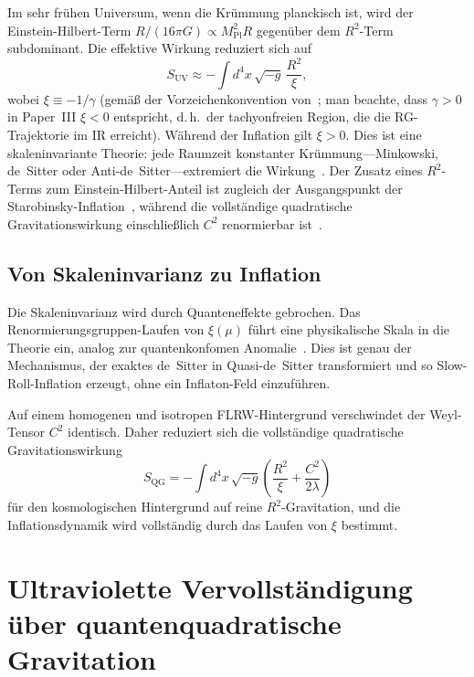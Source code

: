 \documentclass[aps,prd,twocolumn,superscriptaddress,nofootinbib]{revtex4-2}
\begin{document}
Im sehr frühen Universum, wenn die Krümmung planckisch ist, wird der Einstein-Hilbert-Term $R/(16\pi G) \propto M_\mathrm{Pl}^2 R$ gegenüber dem $R^2$-Term subdominant. Die effektive Wirkung reduziert sich auf
\begin{equation}
S_\mathrm{UV} \approx -\int d^4x\,\sqrt{-g}\,\frac{R^2}{\xi},
\label{eq:pure-r2}
\end{equation}
wobei $\xi \equiv -1/\gamma$ (gemäß der Vorzeichenkonvention von~\cite{LiuQuintinAfshordi2026}; man beachte, dass $\gamma > 0$ in Paper~III $\xi < 0$ entspricht, d.\,h.\ der tachyonfreien Region, die die RG-Trajektorie im IR erreicht). Während der Inflation gilt $\xi > 0$. Dies ist eine skaleninvariante Theorie: jede Raumzeit konstanter Krümmung---Minkowski, de~Sitter oder Anti-de~Sitter---extremiert die Wirkung~\cite{Hell2024,Hell2025}. Der Zusatz eines $R^2$-Terms zum Einstein-Hilbert-Anteil ist zugleich der Ausgangspunkt der Starobinsky-Inflation~\cite{Starobinsky1980}, während die vollständige quadratische Gravitationswirkung einschließlich $C^2$ renormierbar ist~\cite{Stelle1977}.

\subsection{Von Skaleninvarianz zu Inflation}

Die Skaleninvarianz wird durch Quanteneffekte gebrochen. Das Renormierungsgruppen-Laufen von $\xi(\mu)$ führt eine physikalische Skala in die Theorie ein, analog zur quantenkonfomen Anomalie~\cite{CapperDuff1974,Duff1994}. Dies ist genau der Mechanismus, der exaktes de~Sitter in Quasi-de~Sitter transformiert und so Slow-Roll-Inflation erzeugt, ohne ein Inflaton-Feld einzuführen.

Auf einem homogenen und isotropen FLRW-Hintergrund verschwindet der Weyl-Tensor $C^2$ identisch. Daher reduziert sich die vollständige quadratische Gravitationswirkung
\begin{equation}
S_\mathrm{QG} = -\int d^4x\,\sqrt{-g}\left(\frac{R^2}{\xi} + \frac{C^2}{2\lambda}\right)
\label{eq:quad-gravity}
\end{equation}
für den kosmologischen Hintergrund auf reine $R^2$-Gravitation, und die Inflationsdynamik wird vollständig durch das Laufen von $\xi$ bestimmt.


\section{Ultraviolette Vervollständigung über quantenquadratische Gravitation}
\label{sec:uv-completion}
\end{document}
